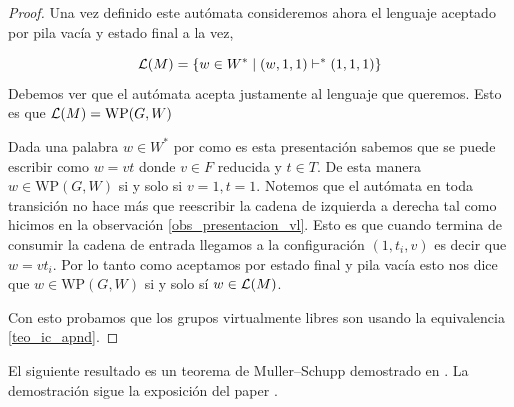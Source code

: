 \documentclass[tesis.tex]{subfiles}
\begin{document}
\begin{proof}
	Una vez definido este autómata consideremos ahora el lenguaje aceptado por pila vacía y estado final a la vez,
	
	\[
		{\cal L }(M) = \{  w \in W^* \mid (w,1,1)   \vdash^*  (1, 1, 1)  \}
	\]
	Debemos ver que el autómata acepta justamente al lenguaje que queremos. 
	Esto es que $ {\cal L }(M) = \text{WP}(G,W) $ 
	
	
	Dada una palabra $w \in W^*$ por como es esta presentación sabemos que se puede escribir como $w = vt$ donde $v \in F$ reducida y $t \in  T$. 
	De esta manera $w \in \text{WP}(G,W)$ si y solo si $v=1, t=1$.
	Notemos que el autómata en toda transición no hace más que reescribir la cadena de izquierda a derecha tal como hicimos en la observación \ref{obs_presentacion_vl}.
	Esto es que cuando termina de consumir la cadena de entrada llegamos a la configuración $(1, t_i, v)$ es decir que $w = vt_i$.
	Por lo tanto como aceptamos por estado final y pila vacía esto nos dice que $w \in \text{WP}(G,W)$ si y solo sí $w \in {\cal L}(M)$.
		
	Con esto probamos que los grupos virtualmente libres son \ic usando la equivalencia \ref{teo_ic_apnd}.
	
\end{proof}


El siguiente resultado es un teorema de Muller--Schupp demostrado en \cite{muller1985theory}.
La demostración sigue la exposición del paper \cite{diekert_contextfree_2017}.
\end{document}
